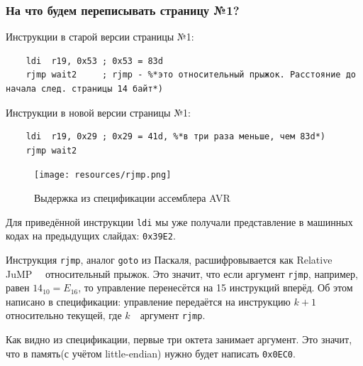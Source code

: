 \documentclass[aspectratio=169, pdf, 8pt, unicode]{beamer}
\begin{document}
\begin{frame}[fragile]
\frametitle{На что будем переписывать страницу №1?}
		Инструкции в старой версии страницы №1:
		\begin{lstlisting}
    ldi  r19, 0x53 ; 0x53 = 83d
    rjmp wait2     ; rjmp - %*это относительный прыжок. Расстояние до начала след. страницы 14 байт*)
		\end{lstlisting}
		Инструкции в новой версии страницы №1:
		\begin{lstlisting}
    ldi  r19, 0x29 ; 0x29 = 41d, %*в три раза меньше, чем 83d*)
    rjmp wait2
		\end{lstlisting}
		\begin{minipage}{0.49\textwidth}
			\begin{figure}[H]
				\centering
				\texttt{[image: resources/rjmp.png]}
				\caption{Выдержка из спецификации ассемблера AVR}
			\end{figure}
		\end{minipage}
		\begin{minipage}{0.49\textwidth}
			Для приведённой инструкции \texttt{ldi} мы уже получали представление в машинных кодах
			на предыдущих слайдах: \texttt{0x39E2}.

			Инструкция \texttt{rjmp}, аналог \texttt{goto} из Паскаля, расшифровывается как Relative JuMP\ \cyrdash
			\ относительный прыжок. Это значит, что если аргумент \texttt{rjmp}, например, равен $14_{10} = E_{16}$,
			то управление перенесётся на 15 инструкций вперёд. Об этом написано в спецификации: управление передаётся
			на инструкцию $k + 1$ относительно текущей, где $k$\ \cyrdash\ аргумент \texttt{rjmp}.

			Как видно из спецификации, первые три октета занимает аргумент. Это значит, что в память(с учётом
			little-endian) нужно будет написать \texttt{0x0EC0}.
		\end{minipage}
\end{frame}
\end{document}
